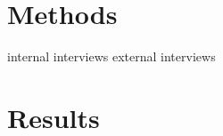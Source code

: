 \documentclass[12pt,a4paper,oneside,pdftex]{report}
\begin{document}
{{\section{Methods}

internal interviews
external interviews

\section{Results}
}}
\end{document}
